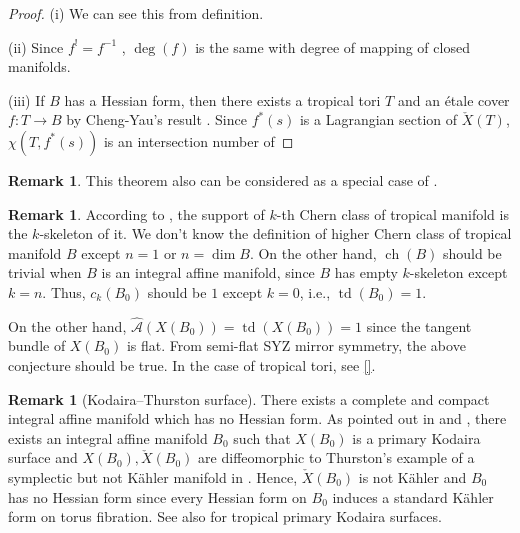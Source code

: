 \documentclass[a4paper,dvipdfmx,reqno,12pt]{amsart}
\theoremstyle{definition}
\newtheorem{Rmk}[Thm]{Remark}
\newcommand{\mcal}[1]{\mathcal{#1}}%
\newcommand{\opn}[1]{\operatorname{#1}}
\numberwithin{equation}{section}
\begin{document}
\begin{proof}
(i) We can see this from definition.

(ii) Since $f^{!}=f^{-1}$ 
\cite[]{iversenCohomologySheaves1986a}
, $\opn{deg}(f)$ is the same with degree of 
mapping of closed manifolds.

(iii) If $B$ has a Hessian form, then there exists a tropical tori $T$
and an \'etale cover $f\colon T\to B$ by Cheng-Yau's result
\cite{MR714338}. Since $f^{*}(s)$ is a Lagrangian section
of $\check{X}(T)$, $\chi(T,f^{*}(s))$ is an intersection
number of
\end{proof}

\begin{Rmk} \label{rmk: integral_mirror}
This theorem also can be considered as a special case of \cite{MR4301560}.
\end{Rmk}

\begin{Rmk}

According to \cite[5.3]{mikhalkinTropicalGeometryIts2006},
the support of $k$-th Chern class of tropical manifold is 
the $k$-skeleton of it.
We don't know the definition of higher Chern class of tropical manifold $B$ except
$n=1$ or $n=\dim B$. 
On the other hand, $\opn{ch}(B)$ should be trivial when $B$ is
an integral affine manifold, since $B$ has empty
$k$-skeleton except $k=n$.
Thus, $c_{k}(B_0)$ should be $1$ except $k=0$, 
i.e., $\opn{td}(B_0)=1$. 

On the other hand, $\hat{\mcal{A}}(X(B_0))=\opn{td}(X(B_0))=1$
since the tangent bundle of $X(B_0)$ is flat.
    From semi-flat SYZ mirror symmetry, the above conjecture should be true. In the case of tropical tori, see \ref{}.
\end{Rmk}

\begin{Rmk}[{Kodaira--Thurston surface}]
There exists a complete and compact integral affine manifold
  which has no Hessian form.
As pointed out in \cite[Example 1.14]{grossMirrorSymmetryLogarithmic2006a}
and \cite[p.403]{MR1461965}, there exists an integral affine manifold
$B_0$ such that
$X(B_0)$ is a primary Kodaira surface and $X(B_0),\check{X}(B_0)$
are diffeomorphic to Thurston's example of a symplectic but
not K\"ahler manifold in \cite{MR402764}.
Hence, $\check{X}(B_0)$ is not K\"ahler and $B_0$ has no
Hessian form since every Hessian form on $B_0$ induces a 
standard K\"ahler form
on torus fibration.
See also \cite{MR1422337} for tropical primary Kodaira surfaces.
\end{Rmk}
\end{document}
